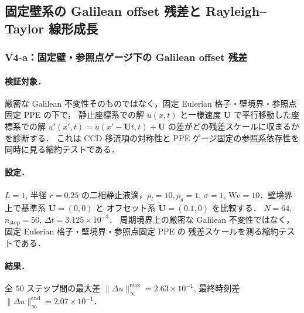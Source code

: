 %
\subsection{固定壁系の Galilean offset 残差と Rayleigh--Taylor 線形成長}
\label{sec:galilean_rt}

\subsubsection{V4-a：固定壁・参照点ゲージ下の Galilean offset 残差}
\label{sec:galilean_invariance}

\paragraph{検証対象．}
厳密な Galilean 不変性そのものではなく，固定 Eulerian 格子・壁境界・参照点固定 PPE の下で，
静止座標系での解 $u(x,t)$ と一様速度 $\bm U$ で平行移動した座標系での解
$u'(x',t) = u(x' - \bm U t, t) + \bm U$ の差がどの残差スケールに収まるかを診断する．
これは CCD 移流項の対称性と PPE ゲージ固定の参照系依存性を同時に見る縮約テストである．

\paragraph{設定．}
$L=1$, 半径 $r=0.25$ の二相静止液滴，$\rho_l=10, \rho_g=1$,
$\sigma=1$, $\mathrm{We}=10$．壁境界上で基準系 $\bm U=(0,0)$ と
オフセット系 $\bm U=(0.1,0)$ を比較する．
$N = 64$, $n_{\mathrm{step}} = 50$, $\Delta t = 3.125\times 10^{-3}$．
周期境界上の厳密な Galilean 不変性ではなく，固定 Eulerian 格子・壁境界・参照点固定 PPE の
残差スケールを測る縮約テストである．

\paragraph{結果．}
全 $50$ ステップ間の最大差 $\|\Delta u\|_\infty^{\max} = 2.63\times 10^{-1}$,
最終時刻差 $\|\Delta u\|_\infty^{\mathrm{end}} = 2.07\times 10^{-1}$．

